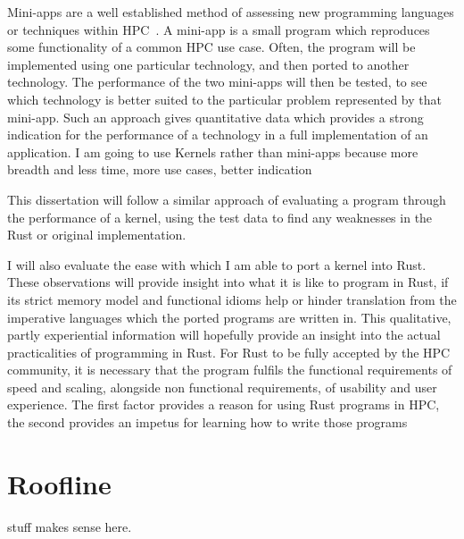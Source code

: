 Mini-apps are a well established method of assessing new programming languages or techniques within HPC~\cite{Mallinson:2014, Slaughter:2015, martineau2017arch}. A mini-app is a small program which reproduces some functionality of a common HPC use case. Often, the program will be implemented using one particular technology, and then ported to another technology. The performance of the two mini-apps will then be tested, to see which technology is better suited to the particular problem represented by that mini-app. Such an approach gives quantitative data which provides a strong indication for the performance of a technology in a full implementation of an application. I am going to use Kernels rather than mini-apps because more breadth and less time, more use cases, better indication

This dissertation will follow a similar approach of evaluating a program through the performance of a kernel, using the test data to find any weaknesses in the Rust or original implementation.

I will also evaluate the ease with which I am able to port a kernel into Rust. These observations will provide insight into what it is like to program in Rust, if its strict memory model and functional idioms help or hinder translation from the imperative languages which the ported programs are written in. This qualitative, partly experiential information will hopefully provide an insight into the actual practicalities of programming in Rust. For Rust to be fully accepted by the HPC community, it is necessary that the program fulfils the functional requirements of speed and scaling, alongside non functional requirements, of usability and user experience. The first factor provides a reason for using Rust programs in HPC, the second provides an impetus for learning how to write those programs


\section{Roofline} stuff makes sense here.
